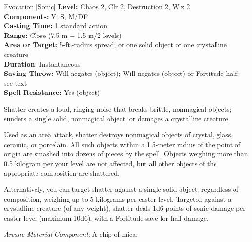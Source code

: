 {Evocation [Sonic]}
{
	\textbf{Level:}
	Chaos 2, Clr 2, Destruction 2, Wiz 2\\
	\textbf{Components:}
	V, S, M/DF\\
	\textbf{Casting Time:}
	1 standard action\\
	\textbf{Range:}
	Close (7.5 m + 1.5 m/2 levels)\\
	\textbf{Area or Target:}
	5-ft.-radius spread; or one solid object or one crystalline creature\\
	\textbf{Duration:}
	Instantaneous\\
	\textbf{Saving Throw:}
	Will negates (object); Will negates (object) or Fortitude half; see text\\
	\textbf{Spell Resistance:}
	Yes (object)\\
}
{
	Shatter creates a loud, ringing noise that breaks brittle, nonmagical objects; sunders a single solid, nonmagical object; or damages a crystalline creature.

	Used as an area attack, shatter destroys nonmagical objects of crystal, glass, ceramic, or porcelain. All such objects within a 1.5-meter radius of the point of origin are smashed into dozens of pieces by the spell. Objects weighing more than 0.5 kilogram per your level are not affected, but all other objects of the appropriate composition are shattered.

	Alternatively, you can target shatter against a single solid object, regardless of composition, weighing up to 5 kilograms per caster level. Targeted against a crystalline creature (of any weight), shatter deals 1d6 points of sonic damage per caster level (maximum 10d6), with a Fortitude save for half damage.

	\textit{Arcane Material Component}:
	A chip of mica.

}
